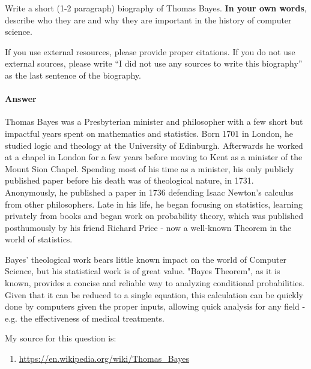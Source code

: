 \documentclass{article}
\begin{document}
Write a short (1-2 paragraph) biography of Thomas Bayes.
\textbf{In your own words}, describe who they are and why they are important in
the history of computer science.

If you use external resources, please provide
proper citations. If you do not use external sources, please write ``I did not
use any sources to write this biography'' as the last sentence of the
biography.

\paragraph{Answer}

Thomas Bayes was a Presbyterian minister and philosopher with a few short but impactful years spent on mathematics and statistics. Born 1701 in London, he studied logic and theology at the University of Edinburgh. Afterwards he worked at a chapel in London for a few years before moving to Kent as a minister of the Mount Sion Chapel. Spending most of his time as a minister, his only publicly published paper before his death was of theological nature, in 1731. Anonymously, he published a paper in 1736 defending Isaac Newton's calculus from other philosophers. Late in his life, he began focusing on statistics, learning privately from books and began work on probability theory, which was published posthumously by his friend Richard Price - now a well-known Theorem in the world of statistics.

Bayes' theological work bears little known impact on the world of Computer Science, but his statistical work is of great value. "Bayes Theorem", as it is known, provides a concise and reliable way to analyzing conditional probabilities. Given that it can be reduced to a single equation, this calculation can be quickly done by computers given the proper inputs, allowing quick analysis for any field - e.g. the effectiveness of medical treatments.

My source for this question is:
\begin{enumerate}
    \item \url{https://en.wikipedia.org/wiki/Thomas_Bayes}
\end{enumerate}

% 
% 
\end{document}
